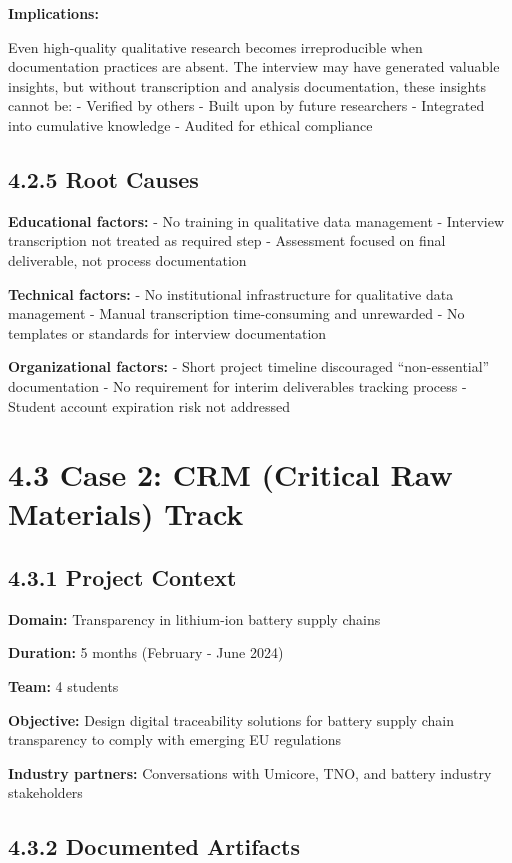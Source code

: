 \documentclass[
  oneside,
  open=any]{scrbook}
\begin{document}
\textbf{Implications:}

Even high-quality qualitative research becomes irreproducible when
documentation practices are absent. The interview may have generated
valuable insights, but without transcription and analysis documentation,
these insights cannot be: - Verified by others - Built upon by future
researchers - Integrated into cumulative knowledge - Audited for ethical
compliance

\subsection{4.2.5 Root Causes}\label{root-causes}

\textbf{Educational factors:} - No training in qualitative data
management - Interview transcription not treated as required step -
Assessment focused on final deliverable, not process documentation

\textbf{Technical factors:} - No institutional infrastructure for
qualitative data management - Manual transcription time-consuming and
unrewarded - No templates or standards for interview documentation

\textbf{Organizational factors:} - Short project timeline discouraged
``non-essential'' documentation - No requirement for interim
deliverables tracking process - Student account expiration risk not
addressed

\section{4.3 Case 2: CRM (Critical Raw Materials)
Track}\label{case-2-crm-critical-raw-materials-track}

\subsection{4.3.1 Project Context}\label{project-context-1}

\textbf{Domain:} Transparency in lithium-ion battery supply chains

\textbf{Duration:} 5 months (February - June 2024)

\textbf{Team:} 4 students

\textbf{Objective:} Design digital traceability solutions for battery
supply chain transparency to comply with emerging EU regulations

\textbf{Industry partners:} Conversations with Umicore, TNO, and battery
industry stakeholders

\subsection{4.3.2 Documented Artifacts}\label{documented-artifacts-1}
\end{document}
